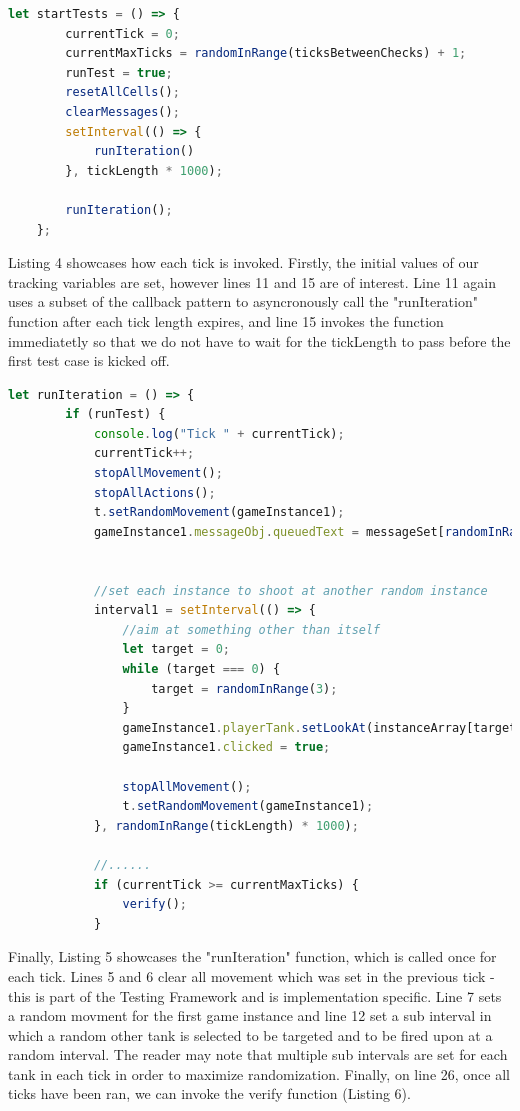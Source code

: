 \documentclass[conference]{IEEEtran}
\begin{document}
\begin{lstlisting}[language=JavaScript,caption={Snippet of Invoking a Random Number of Automatic Tests}]
        let startTests = () => {
        currentTick = 0;
        currentMaxTicks = randomInRange(ticksBetweenChecks) + 1;
        runTest = true;
        resetAllCells();
        clearMessages();
        setInterval(() => {
            runIteration()
        }, tickLength * 1000);

        runIteration();
    };
\end{lstlisting}

Listing 4 showcases how each tick is invoked. Firstly, the initial values of our tracking variables are set, however lines 11 and 15 are of interest. Line 11 again uses a subset of the callback pattern
to asyncronously call the "runIteration" function after each tick length expires, and line 15 invokes the function immediatetly so that we do not have to wait for the tickLength to pass before the first
test case is kicked off. 

\begin{lstlisting}[language=JavaScript,caption={Snippet of runIteration}]
    let runIteration = () => {
        if (runTest) {
            console.log("Tick " + currentTick);
            currentTick++;
            stopAllMovement();
            stopAllActions();
            t.setRandomMovement(gameInstance1);
            gameInstance1.messageObj.queuedText = messageSet[randomInRange(messageSet.length - 1)];


            //set each instance to shoot at another random instance
            interval1 = setInterval(() => {
                //aim at something other than itself
                let target = 0;
                while (target === 0) {
                    target = randomInRange(3);
                }
                gameInstance1.playerTank.setLookAt(instanceArray[target].playerTank.group.position);
                gameInstance1.clicked = true;

                stopAllMovement();
                t.setRandomMovement(gameInstance1);
            }, randomInRange(tickLength) * 1000);
			
			//......
			if (currentTick >= currentMaxTicks) {
                verify();
            }
\end{lstlisting}

Finally, Listing 5 showcases the "runIteration" function, which is called once for each tick. Lines 5 and 6 clear all movement which was set in the previous tick - this is part of the Testing Framework
and is implementation specific. Line 7 sets a random movment for the first game instance and line 12 set a sub interval in which a random other tank is selected to be targeted and to be fired upon at a 
random interval. The reader may note that multiple sub intervals are set for each tank in each tick in order to maximize randomization. Finally, on line 26, once all ticks have been ran,
we can invoke the verify function (Listing 6).
\end{document}
